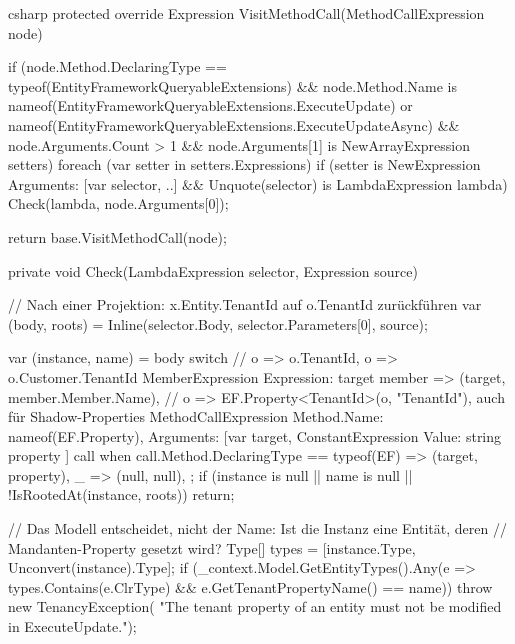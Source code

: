 \begin{sourcecode}{csharp}
protected override Expression VisitMethodCall(MethodCallExpression node)
{
    if (node.Method.DeclaringType == typeof(EntityFrameworkQueryableExtensions)
        && node.Method.Name is nameof(EntityFrameworkQueryableExtensions.ExecuteUpdate)
            or nameof(EntityFrameworkQueryableExtensions.ExecuteUpdateAsync)
        && node.Arguments.Count > 1
        && node.Arguments[1] is NewArrayExpression setters)
    {
        foreach (var setter in setters.Expressions)
        {
            if (setter is NewExpression { Arguments: [var selector, ..] }
                && Unquote(selector) is LambdaExpression lambda)
                Check(lambda, node.Arguments[0]);
        }
    }

    return base.VisitMethodCall(node);
}

private void Check(LambdaExpression selector, Expression source)
{
    // Nach einer Projektion: x.Entity.TenantId auf o.TenantId zurückführen
    var (body, roots) = Inline(selector.Body, selector.Parameters[0], source);

    var (instance, name) = body switch
    {
        // o => o.TenantId, o => o.Customer.TenantId
        MemberExpression { Expression: { } target } member => (target, member.Member.Name),
        // o => EF.Property<TenantId>(o, "TenantId"), auch für Shadow-Properties
        MethodCallExpression
        {
            Method.Name: nameof(EF.Property),
            Arguments: [var target, ConstantExpression { Value: string property }]
        } call when call.Method.DeclaringType == typeof(EF) => (target, property),
        _ => (null, null),
    };
    if (instance is null || name is null || !IsRootedAt(instance, roots))
        return;

    // Das Modell entscheidet, nicht der Name: Ist die Instanz eine Entität, deren
    // Mandanten-Property gesetzt wird?
    Type[] types = [instance.Type, Unconvert(instance).Type];
    if (_context.Model.GetEntityTypes().Any(e =>
            types.Contains(e.ClrType) && e.GetTenantPropertyName() == name))
        throw new TenancyException(
            "The tenant property of an entity must not be modified in ExecuteUpdate.");
}
\end{sourcecode}

